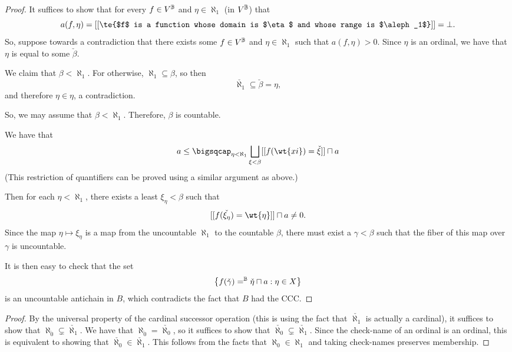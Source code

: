 \documentclass[11pt]{article}
\begin{document}
\begin{proof}
  It suffices to show that for every $f \in V^{\mathbb{B}}$ and $\eta \in \aleph_1$ (in $V^{\mathbb{B}}$) that
  $$
a(f, \eta) = [[ \te{$f$ is a function whose domain is $\eta$ and whose range is $\aleph_1$}]] = \bot.
$$
So, suppose towards a contradiction that there exists some $f \in V^{\mathbb{B}}$ and $\eta \in \aleph_1$ such that $a(f,\eta) > 0$. Since $\eta$ is an ordinal, we have that $\eta$ is equal to some $\check{\beta}$.

We claim that $\beta < \aleph_1$. For otherwise, $\aleph_1 \subseteq \beta$, so then
$$
\check{\aleph_1} \subseteq \check{\beta} = \eta,
$$
and therefore $\eta \in \eta$, a contradiction.

So, we may assume that $\beta < \aleph_1$. Therefore, $\beta$ is countable.

We have that
$$
a \leq \bigsqcap_{\eta < \aleph_1} \bigsqcup_{\xi < \beta} [[f(\wt{xi}) = \check{\xi}]] \sqcap a
$$
(This restriction of quantifiers can be proved using a similar argument as above.)

Then for each $\eta < \aleph_1$, there exists a least $\xi_{\eta} < \beta$ such that
$$
[[f(\check{\xi_{\eta}}) = \wt{\eta}]] \sqcap a \neq 0.
$$
Since the map $\eta \mapsto \xi_{\eta}$ is a map from the uncountable $\aleph_1$ to the countable $\beta$, there must exist a $\gamma < \beta$ such that the fiber of this map over $\gamma$ is uncountable.

It is then easy to check that the set
$$
\left\{f(\check{\gamma}) =^{\mathbb{B}} \check{\eta} \sqcap a : \eta \in X\right\}
$$
is an uncountable antichain in $B$, which contradicts the fact that $B$ had the CCC.
\end{proof}

\begin{proof}
  By the universal property of the cardinal successor operation (this is using the fact that $\check{\aleph_1}$ is actually a cardinal), it suffices to show that $\aleph_{\check{0}} \subsetneq \check{\aleph_1}$. We have that $\aleph_{\check{0}} = \check{\aleph_0}$, so it suffices to show that $\check{\aleph_0} \subsetneq \check{\aleph_1}$. Since the check-name of an ordinal is an ordinal, this is equivalent to showing that $\check{\aleph_0} \in \check{\aleph_1}$. This follows from the facts that $\aleph_0 \in \aleph_1$ and taking check-names preserves membership.
\end{proof}
\end{document}
